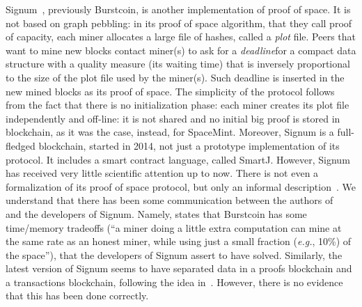 
Signum~\cite{Signum}, previously Burstcoin, is another implementation of proof of space.
It is not based on graph pebbling: in its proof of space algorithm, that they
call proof of capacity, each miner allocates a large file of hashes, called a
\emph{plot} file. Peers that want to mine new blocks contact miner(s) to ask for a
\emph{deadline}\ie for a compact data structure with a quality measure (its waiting time) that
is inversely proportional to the size of the plot file used by the miner(s). Such deadline is
inserted in the new mined blocks as its proof of space. The simplicity of the protocol
follows from the fact that there is no initialization phase: each miner creates its plot file
independently and off-line: it is not shared and no initial big proof is stored in
blockchain, as it was the case, instead, for SpaceMint. Moreover, Signum is a full-fledged blockchain,
started in 2014, not just a prototype implementation of its protocol. It includes a smart
contract language, called SmartJ. However, Signum has received very little scientific
attention up to now. There is not even a formalization of its proof of space protocol,
but only an informal description~\cite{SignumPlotting}.
We understand that there has been some communication between the authors of~\cite{ParkKFGAP18}
and the developers of Signum. Namely, \cite{ParkKFGAP18} states that Burstcoin has some
time/memory tradeoffs (``a miner doing a little extra computation can mine at the same
rate as an honest miner, while using just a small fraction (\emph{e.g.}, 10\%) of the space''),
that the developers of Signum assert to have solved. Similarly, the latest version of Signum
seems to have separated data in a proofs blockchain and a transactions blockchain,
following the idea in~\cite{ParkKFGAP18}. However, there is no evidence that this has been done
correctly.
